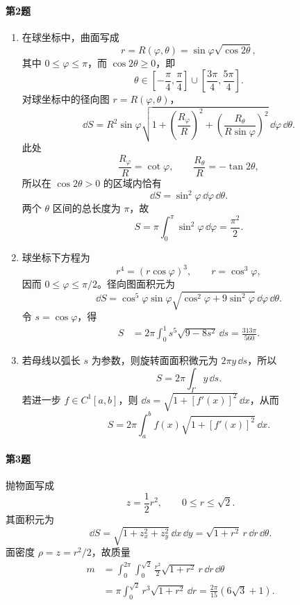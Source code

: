 \paragraph{第2题}
\begin{xsolution}
\begin{enumerate}[label=(\arabic*)]
  \item 在球坐标中，曲面写成
  \[
   r=R(\varphi,\theta)=\sin\varphi\sqrt{\cos2\theta},
  \]
  其中 $0\le\varphi\le\pi$，而 $\cos2\theta\ge0$，即
  \[
   \theta\in\left[-\frac\pi4,\frac\pi4\right]
   \cup\left[\frac{3\pi}{4},\frac{5\pi}{4}\right].
  \]
  对球坐标中的径向图 $r=R(\varphi,\theta)$，
  \[
   \dd S=R^2\sin\varphi
   \sqrt{1+\left(\frac{R_\varphi}{R}\right)^2+
   \left(\frac{R_\theta}{R\sin\varphi}\right)^2}
   \,\dd\varphi\,\dd\theta.
  \]
  此处
  \[
   \frac{R_\varphi}{R}=\cot\varphi,
   \qquad
   \frac{R_\theta}{R}=-\tan2\theta,
  \]
  所以在 $\cos2\theta>0$ 的区域内恰有
  \[
   \dd S=\sin^2\varphi\,\dd\varphi\,\dd\theta.
  \]
  两个 $\theta$ 区间的总长度为 $\pi$，故
  \[
   \boxed{S=\pi\int_0^\pi\sin^2\varphi\,\dd\varphi=\frac{\pi^2}{2}}.
  \]

  \item 球坐标下方程为
  \[
   r^4=(r\cos\varphi)^3,
   \qquad r=\cos^3\varphi,
  \]
  因而 $0\le\varphi\le\pi/2$。径向图面积元为
  \[
   \dd S=\cos^5\varphi\sin\varphi
   \sqrt{\cos^2\varphi+9\sin^2\varphi}
   \,\dd\varphi\,\dd\theta.
  \]
  令 $s=\cos\varphi$，得
  \begin{align*}
   S&=2\pi\int_0^1s^5\sqrt{9-8s^2}\,\dd s
   =\boxed{\frac{313\pi}{560}}.
  \end{align*}

  \item 若母线以弧长 $s$ 为参数，则旋转面面积微元为 $2\pi y\,\dd s$，所以
  \[
   \boxed{S=2\pi\int_\Gamma y\,\dd s}.
  \]
  若进一步 $f\in C^1[a,b]$，则 $\dd s=\sqrt{1+[f'(x)]^2}\,\dd x$，从而
  \[
   \boxed{S=2\pi\int_a^bf(x)\sqrt{1+[f'(x)]^2}\,\dd x}.
  \]
\end{enumerate}
\end{xsolution}

\paragraph{第3题}
\begin{xsolution}
抛物面写成
\[
 z=\frac12r^2,
 \qquad0\le r\le\sqrt2.
\]
其面积元为
\[
 \dd S=\sqrt{1+z_x^2+z_y^2}\,\dd x\,\dd y
 =\sqrt{1+r^2}\,r\,\dd r\,\dd\theta.
\]
面密度 $\rho=z=r^2/2$，故质量
\begin{align*}
 m&=\int_0^{2\pi}\int_0^{\sqrt2}
 \frac{r^2}{2}\sqrt{1+r^2}\,r\,\dd r\,\dd\theta\\
 &=\pi\int_0^{\sqrt2}r^3\sqrt{1+r^2}\,\dd r
 =\boxed{\frac{2\pi}{15}(6\sqrt3+1)}.
\end{align*}
\end{xsolution}

